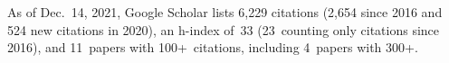 %
As of Dec.~14, 2021, Google Scholar lists
6,229 citations (2,654 since 2016 and 524 new citations in 2020),
an h-index of~33 (23~counting only citations since 2016),
and 11~papers with 100+~citations, including 4~papers with 300+.
